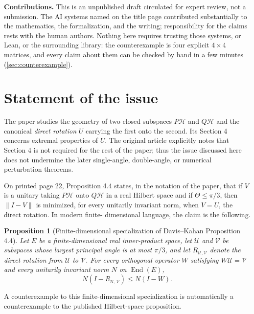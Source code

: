 \documentclass[11pt]{article}
\newtheorem{proposition}[theorem]{Proposition}
\theoremstyle{definition}
\newcommand{\Hh}{\mathcal H}
\newcommand{\DK}{Davis--Kahan}
\begin{document}
\begin{statusbox}
\textbf{Contributions.}  This is an unpublished draft circulated for expert
review, not a submission.  The AI systems named on the title page contributed
substantially to the mathematics, the formalization, and the writing;
responsibility for the claims rests with the human authors.  Nothing here
requires trusting those systems, or Lean, or the surrounding library: the
counterexample is four explicit $4\times4$ matrices, and every claim about them
can be checked by hand in a few minutes (\cref{sec:counterexample}).
\end{statusbox}

\section{Statement of the issue}

The paper \cite{DavisKahan1970} studies the geometry of two closed subspaces
$P\Hh$ and $Q\Hh$ and the canonical \emph{direct rotation} $U$ carrying the
first onto the second.  Its Section 4 concerns extremal properties of $U$.
The original article explicitly notes that Section 4 is not required for the
rest of the paper; thus the issue discussed here does not undermine the later
single-angle, double-angle, or numerical perturbation theorems.

On printed page 22, Proposition 4.4 states, in the notation of the paper, that
if $V$ is a unitary taking $P\Hh$ onto $Q\Hh$ in a real Hilbert space and if
$\Theta\leq \pi/3$, then $\lVert I-V\rVert$ is minimized, for every
unitarily invariant norm, when $V=U$, the direct rotation.  In modern finite-
dimensional language, the claim is the following.

\begin{proposition}[Finite-dimensional specialization of \DK{} Proposition 4.4]
\label{prop:published-claim}
Let $E$ be a finite-dimensional real inner-product space, let $\mathcal U$ and
$\mathcal V$ be subspaces whose largest principal angle is at most $\pi/3$, and
let $R_{\mathcal U,\mathcal V}$ denote the direct rotation from $\mathcal U$ to
$\mathcal V$.  For every orthogonal operator $W$ satisfying
$W\mathcal U=\mathcal V$ and every unitarily invariant norm $N$ on
$\operatorname{End}(E)$,
\[
 N(I-R_{\mathcal U,\mathcal V})\leq N(I-W).
\]
\end{proposition}

A counterexample to this finite-dimensional specialization is automatically a
counterexample to the published Hilbert-space proposition.
\end{document}
